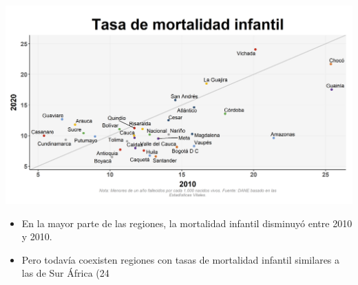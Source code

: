 \documentclass[aspectratio=169]{beamer}
\begin{document}
        \begin{slide}{13} 
                      \begin{imagecolumn}
                \includegraphics[width=\columnwidth]{img/var_290_scatter_time.png}
            \end{imagecolumn}
            \begin{textcolumn}
                \begin{itemize}
                    \item En la mayor parte de las regiones, la mortalidad infantil disminuyó entre 2010 y 2010. 
                    \item Pero todavía coexisten regiones con tasas de mortalidad infantil similares a las de Sur África (24%
                \end{itemize}
            \end{textcolumn}

    \printcolumns
    \end{slide}
  
  
\end{document}
